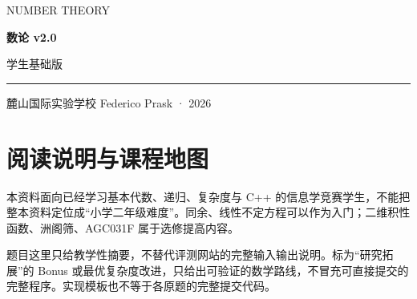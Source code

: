 \documentclass[UTF8,a4paper,11pt,twoside,openright,fontset=fandol]{ctexbook}
\theoremstyle{definition}
\newcommand{\docversion}{v2.0}
\begin{document}
\frontmatter
\begin{titlepage}
\setlength{\parindent}{0pt}
\vspace*{1.2cm}
{\large\color{accent}NUMBER THEORY}\par
\vspace{1cm}
{\fontsize{46}{65}\selectfont\bfseries\color{ink}数论 \huge{\docversion}}\par
\vspace{0.5cm}
{\Large 学生基础版}\par
\vspace{0.5cm}
{\color{accent}\rule{\textwidth}{1.2pt}}\par
\vspace{0.3cm}
\begin{minipage}{0.9\textwidth}
\large 麓山国际实验学校 Federico Prask · 2026
\end{minipage}\par
\vfill
{\normalsize }\par
{\small}
\end{titlepage}
\chapter*{阅读说明与课程地图}

\begin{pitfall}[适用范围与阅读边界]
本资料面向已经学习基本代数、递归、复杂度与 C++ 的信息学竞赛学生，不能把整本资料定位成“小学二年级难度”。同余、线性不定方程可以作为入门；二维积性函数、洲阁筛、AGC031F 属于选修提高内容。

题目这里只给教学性摘要，不替代评测网站的完整输入输出说明。标为“研究拓展”的 Bonus 或最优复杂度改进，只给出可验证的数学路线，不冒充可直接提交的完整程序。实现模板也不等于各原题的完整提交代码。
\end{pitfall}
\end{document}
